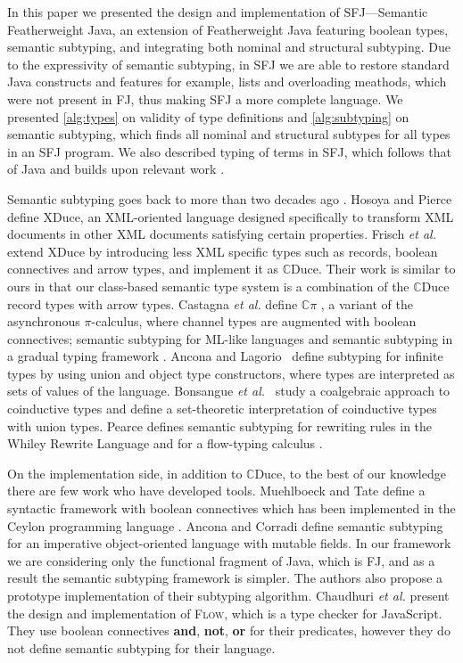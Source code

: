 \documentclass[runningheads]{llncs}
\begin{document}
In this paper we presented the design and implementation of SFJ---Semantic Featherweight Java, an extension of Featherweight Java featuring boolean types, semantic subtyping, and integrating both nominal and structural subtyping. Due to the expressivity of semantic subtyping, in SFJ we are able to restore standard Java constructs and features for example, lists and overloading meathods, which were not present in FJ, thus making SFJ a more complete language.
We presented \autoref{alg:types} on validity of type definitions and
\autoref{alg:subtyping} on semantic subtyping, which finds all nominal and structural subtypes for all types in an SFJ program. We also described typing of terms in SFJ, which follows that of Java and builds upon relevant work \cite{Dardha2013,Dardha2017}.


Semantic subtyping goes back to more than two decades ago \cite{Aiken,Damm}.
%
Hosoya and Pierce \cite{XML1,XML2,XML3} define XDuce, an XML-oriented language designed specifically to transform XML documents in other XML documents satisfying certain properties.
%
Frisch \emph{et al.} \cite{FCB08} extend XDuce by introducing less XML specific types such as records, boolean connectives and arrow types, and implement it as $\mathbb{C}$Duce. Their work is similar to ours in that our class-based semantic type system is a combination of the $\mathbb{C}$Duce record types with arrow types.
%
Castagna \emph{et al.} define $\mathbb{C}\pi$ \cite{Cpi}, a variant of the asynchronous $\pi$-calculus, where channel types are augmented with boolean connectives;
semantic subtyping for ML-like languages \cite{CastagnaP016} and semantic subtyping in a gradual typing framework \cite{CastagnaL17}.
%
Ancona and Lagorio~\cite{AL10} define subtyping for infinite types by using union and object type constructors, where types are interpreted as sets of values of the language.
%
Bonsangue \emph{et al.}~\cite{BRABR14} study a coalgebraic approach to coinductive types and define a set-theoretic interpretation of coinductive types with union types.
%
Pearce \cite{Pearce19} defines semantic subtyping for rewriting rules in the Whiley Rewrite Language and for a flow-typing calculus  \cite{Pearce13}.

On the implementation side, in addition to $\mathbb{C}$Duce, to the best of our knowledge there are few work who have developed tools.
%
Muehlboeck and Tate \cite{Muehlboeck2018} define a syntactic framework with boolean connectives which has been implemented in the Ceylon programming language \cite{Ceylon2016}.
%
Ancona and Corradi \cite{AnconaC16} define semantic subtyping for an imperative object-oriented language with mutable fields. In our framework we are considering only the functional fragment of Java, which is FJ, and as a result the semantic subtyping framework is simpler. The authors also propose a prototype implementation of their subtyping algorithm.
%
Chaudhuri \emph{et al.} \cite{ChaudhuriVGRL17} present the design and implementation of \textsc{Flow}, which is a type checker for JavaScript. They use boolean connectives \textbf{and}, \textbf{not}, \textbf{or} for their predicates, however they do not define semantic subtyping for their language.



\end{document}
